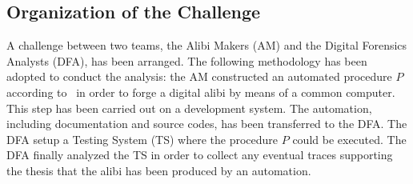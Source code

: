 \documentclass[10pt, conference]{IEEEtran}
\begin{document}

\subsection{Organization of the Challenge}
\label{sub:organization}


A challenge between two teams, the Alibi Makers (AM) and the Digital Forensics Analysts (DFA), has been arranged.
The following methodology has been adopted to conduct the
analysis: the AM constructed an automated procedure $P$ according to~\cite{autoalibi} in order to forge a
digital alibi by means of a common computer. This step has been carried out on a development system.
The automation, including documentation and source codes, has been transferred to
the DFA. The DFA setup a Testing System (TS) where the procedure $P$  could be executed.
The DFA finally analyzed the TS in order to collect any eventual traces supporting the thesis that the alibi
has been produced by an automation.


%

\end{document}
